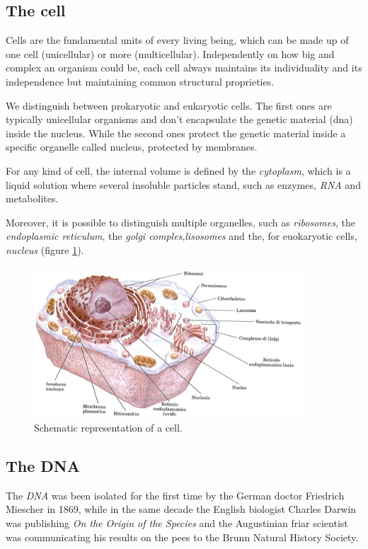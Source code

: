 \subsection{The cell}
\label{sec:cell}
Cells are the fundamental units of every living being, which can be made up of one cell (unicellular) or more (multicellular).
Independently on how big and complex an organism could be, each cell always maintains its individuality and its independence but maintaining common structural proprieties.

We distinguish between prokaryotic and eukaryotic cells. 
The first ones are typically unicellular organisms and don't encapsulate the genetic material (\gls{dna}) inside the nucleus.
While the second ones protect the genetic material inside a specific organelle called nucleus, protected by membranes.

For any kind of cell, the internal volume is defined by the \textit{cytoplasm}, which is a liquid solution where several insoluble particles stand, such as enzymes, \textit{RNA} and metabolites.

Moreover, it is possible to distinguish multiple organelles, such as \textit{ribosomes}, the \textit{endoplasmic reticulum}, the \textit{golgi comples},\textit{lisosomes} and the, for euokaryotic cells, \textit{nucleus} (figure \ref{fig:cell}).

\begin{figure}[h]
\centering
\includegraphics[width=10cm, keepaspectratio]{img/intro/cell.png}
\caption[The Cell]{Schematic representation of a cell.}
\label{fig:cell}
\end{figure}

\subsection{The DNA}
\label{sec:genica}
The \textit{DNA} was been isolated for the first time by the German doctor Friedrich Miescher in 1869, while in the same decade the English biologist Charles Darwin was publishing \textit{On the Origin of the Species} and the  Augustinian friar scientist was communicating his results on the pees to the Brunn Natural History Society.

